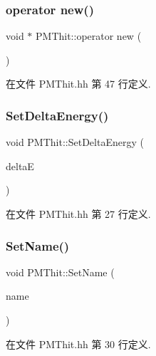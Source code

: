 \subsubsection{\texorpdfstring{operator new()}{operator new()}}
{\footnotesize\ttfamily void $\ast$ P\+M\+Thit\+::operator new (\begin{DoxyParamCaption}\item[{size\+\_\+t}]{ }\end{DoxyParamCaption})\hspace{0.3cm}{\ttfamily [inline]}}



在文件 P\+M\+Thit.\+hh 第 47 行定义.

\mbox{\label{classPMThit_ae3dd4063284349849402f37858abbe64}} 
\subsubsection{\texorpdfstring{Set\+Delta\+Energy()}{SetDeltaEnergy()}}
{\footnotesize\ttfamily void P\+M\+Thit\+::\+Set\+Delta\+Energy (\begin{DoxyParamCaption}\item[{G4double}]{deltaE }\end{DoxyParamCaption})\hspace{0.3cm}{\ttfamily [inline]}}



在文件 P\+M\+Thit.\+hh 第 27 行定义.

\mbox{\label{classPMThit_a4cd9d9b804e276177e9fd1d4200d2e70}} 
\subsubsection{\texorpdfstring{Set\+Name()}{SetName()}}
{\footnotesize\ttfamily void P\+M\+Thit\+::\+Set\+Name (\begin{DoxyParamCaption}\item[{G4\+String}]{name }\end{DoxyParamCaption})\hspace{0.3cm}{\ttfamily [inline]}}



在文件 P\+M\+Thit.\+hh 第 30 行定义.

